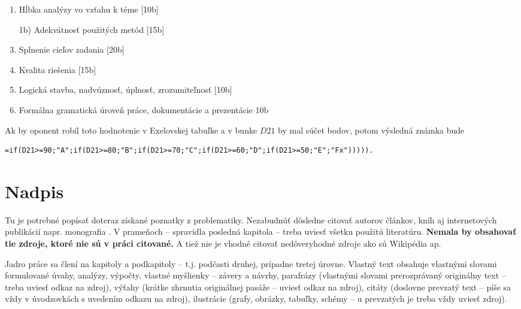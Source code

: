 \begin{enumerate}

\item{Hĺbka analýzy vo vzťahu k téme [10b]}

\item[1b)]{Adekvátnosť použitých metód [15b]}

\item{Splnenie cieľov zadania [20b]}

\item{Kvalita riešenia [15b]}

\item{Logická stavba, nadvúznosť, úplnosť, zrozumiteľnosť [10b]}

\item{Formálna gramatická úroveň práce, dokumentácie a prezentácie 10b}

\end{enumerate}

Ak by oponent robil toto hodnotenie v Exelovskej tabuľke a v bunke $D21$ by mal
súčet bodov, potom výsledná známka bude

{\scriptsize
\begin{verbatim}
=if(D21>=90;"A";if(D21>=80;"B";if(D21>=70;"C";if(D21>=60;"D";if(D21>=50;"E";"Fx"))))).
\end{verbatim}
}

\chapter{Nadpis}

Tu je potrebné popísať doteraz získané poznatky z problematiky. 
Nezabudnúť dôsledne citovať autorov článkov, kníh aj internetových publikácií 
napr. monografia \cite{berman}. 
V prameňoch -- spravidla posledná kapitola -- treba uviesť všetku použitú literatúru. 
\textbf{Nemala by obsahovať tie zdroje, ktoré nie sú v práci citované.}
A tiež nie je vhodné citovať nedôveryhodné zdroje ako sú Wikipédia ap.

Jadro práce sa člení na kapitoly a podkapitoly – t.j. podčasti druhej, prípadne tretej úrovne. Vlastný text obsahuje vlastnými slovami formulované úvahy, analýzy, výpočty, vlastné myšlienky – závery a návrhy, parafrázy (vlastnými slovami prerozprávaný originálny text – treba uviesť odkaz na zdroj), výťahy (krátke zhrnutia originálnej pasáže – uviesť odkaz na zdroj), citáty (doslovne prevzatý text – píše sa vždy v úvodzovkách s uvedením odkazu na zdroj), ilustrácie (grafy, obrázky, tabuľky, schémy – u prevzatých je treba vždy uviesť zdroj).

